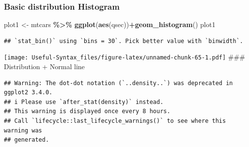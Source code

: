 \documentclass[
]{article}
\newenvironment{Shaded}{\begin{snugshade}}{\end{snugshade}}
\newcommand{\AttributeTok}[1]{\textcolor[rgb]{0.13,0.29,0.53}{#1}}
\newcommand{\CommentTok}[1]{\textcolor[rgb]{0.56,0.35,0.01}{\textit{#1}}}
\newcommand{\DecValTok}[1]{\textcolor[rgb]{0.00,0.00,0.81}{#1}}
\newcommand{\FunctionTok}[1]{\textcolor[rgb]{0.13,0.29,0.53}{\textbf{#1}}}
\newcommand{\NormalTok}[1]{#1}
\newcommand{\OtherTok}[1]{\textcolor[rgb]{0.56,0.35,0.01}{#1}}
\newcommand{\SpecialCharTok}[1]{\textcolor[rgb]{0.81,0.36,0.00}{\textbf{#1}}}
\begin{document}
\hypertarget{basic-distribution-histogram}{%
\subsubsection{Basic distribution Histogram}\label{basic-distribution-histogram}}

\begin{Shaded}
\begin{Highlighting}[]
\NormalTok{plot1 }\OtherTok{\textless{}{-}}\NormalTok{ mtcars }\SpecialCharTok{\%\textgreater{}\%} \FunctionTok{ggplot}\NormalTok{(}\FunctionTok{aes}\NormalTok{(qsec))}\SpecialCharTok{+}\FunctionTok{geom\_histogram}\NormalTok{()}
\NormalTok{plot1}
\end{Highlighting}
\end{Shaded}

\begin{verbatim}
## `stat_bin()` using `bins = 30`. Pick better value with `binwidth`.
\end{verbatim}

\texttt{[image: Useful-Syntax\_files/figure-latex/unnamed-chunk-65-1.pdf]}
\#\#\# Distribution + Normal line

\begin{Shaded}
\end{Shaded}

\begin{verbatim}
## Warning: The dot-dot notation (`..density..`) was deprecated in ggplot2 3.4.0.
## i Please use `after_stat(density)` instead.
## This warning is displayed once every 8 hours.
## Call `lifecycle::last_lifecycle_warnings()` to see where this warning was
## generated.
\end{verbatim}
\end{document}

